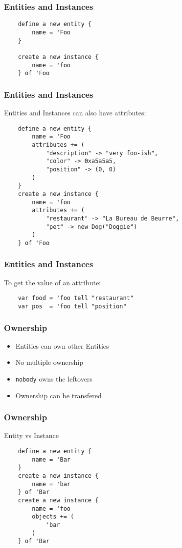 \documentclass{beamer}
\begin{document}
\begin{frame}[fragile]
    \frametitle{Entities and Instances}
    \begin{lstlisting}
    define a new entity {
        name = 'Foo
    }

    create a new instance {
        name = 'foo
    } of 'Foo
    \end{lstlisting}
\end{frame}

\begin{frame}[fragile]
    \frametitle{Entities and Instances}
    Entities and Instances can also have attributes:
    \begin{lstlisting}
    define a new entity {
        name = 'Foo
        attributes += (
            "description" -> "very foo-ish",
            "color" -> 0xa5a5a5,
            "position" -> (0, 0)
        )
    }
    create a new instance {
        name = 'foo
        attributes += (
            "restaurant" -> "La Bureau de Beurre",
            "pet" -> new Dog("Doggie")
        )
    } of 'Foo
    \end{lstlisting}
\end{frame}

\begin{frame}[fragile]
    \frametitle{Entities and Instances}
    To get the value of an attribute:
    \begin{lstlisting}
    var food = 'foo tell "restaurant"
    var pos  = 'foo tell "position"
    \end{lstlisting}
\end{frame}

\begin{frame}
    \frametitle{Ownership}
    \begin{itemize}[<+->]
        \item{Entities can own other Entities}
        \item{No multiple ownership}
        \item{\texttt{nobody} owns the leftovers}
        \item{Ownership can be transfered}
    \end{itemize}
\end{frame}

\begin{frame}[fragile]
    \frametitle{Ownership}
    Entity vs Instance
    \begin{lstlisting}
    define a new entity {
        name = 'Bar
    }
    create a new instance {
        name = 'bar
    } of 'Bar
    create a new instance {
        name = 'foo
        objects += (
            'bar
        )
    } of 'Bar
    \end{lstlisting}
\end{frame}
\end{document}
